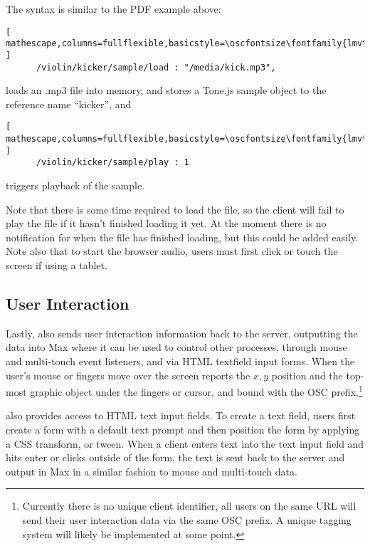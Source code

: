 \noindent
\begin{minipage}{\linewidth}
The syntax is similar to the PDF example above:

\begin{lstlisting}[ mathescape,columns=fullflexible,basicstyle=\oscfontsize\fontfamily{lmvtt}\selectfont ]
      /violin/kicker/sample/load : "/media/kick.mp3",
\end{lstlisting}

\noindent
loads an .mp3 file into memory, and stores a Tone.js sample object to the reference name ``kicker'', and

\begin{lstlisting}[ mathescape,columns=fullflexible,basicstyle=\oscfontsize\fontfamily{lmvtt}\selectfont ]
      /violin/kicker/sample/play : 1
\end{lstlisting}

\noindent
triggers playback of the sample.
\end{minipage}

\medskip
Note that there is some time required to load the file, so the client will fail to play the file if it hasn't finished loading it yet. At the moment there is no notification for when the file has finished loading, but this could be added easily.
Note also that to start the browser audio, users must first click or touch the screen if using a tablet.

\subsection{User Interaction}\label{sec:interaction}
Lastly, \drawsocket also sends user interaction information back to the server, outputting the data into Max where it can be used to control other processes, through mouse and multi-touch event listeners, and via HTML textfield input forms.
When the user's mouse or fingers move over the screen \drawsocket reports the $x,y$ position and the top-most graphic object under the fingers or cursor, and bound with the OSC prefix.\footnote{Currently there is no unique client identifier, all users on the same URL will send their user interaction data via the same OSC prefix. A unique tagging system will likely be implemented at some point.}

\drawsocket also provides access to HTML text input fields. To create a text field, users first create a form with a default text prompt and then position the form by applying a CSS transform, or tween. When a client enters text into the text input field and hits enter or clicks outside of the form, the text is sent back to the server and output in Max in a similar fashion to mouse and multi-touch data.

